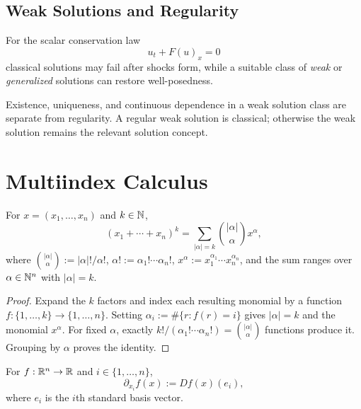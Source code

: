 \subsection{Weak Solutions and Regularity}
\label{sec:weak-solutions-regularity}

For the scalar conservation law
$$u_t + F(u)_x = 0$$
classical solutions may fail after shocks form, while a suitable class of
\emph{weak} or \emph{generalized} solutions can restore well-posedness.

Existence, uniqueness, and continuous dependence in a weak solution class are
separate from regularity. A regular weak solution is classical; otherwise the
weak solution remains the relevant solution concept.

\section{Multiindex Calculus}
\label{sec:multiindex-calculus}

\begin{proposition}
\label{ex:multinomial-theorem}




For $x = (x_1, \ldots, x_n)$ and $k \in \mathbb{N}$,
\[
\left(x_1 + \cdots + x_n\right)^k
= \sum_{|\alpha|=k} \binom{|\alpha|}{\alpha}x^\alpha,
\]
where $\binom{|\alpha|}{\alpha} := |\alpha|!/\alpha!$,
$\alpha! := \alpha_1!\cdots\alpha_n!$, $x^\alpha :=
x_1^{\alpha_1}\cdots x_n^{\alpha_n}$, and the sum ranges over
$\alpha \in \mathbb{N}^n$ with $|\alpha|=k$.
\end{proposition}
\begin{proof}

\sketch
Expand the $k$ factors and index each resulting monomial by a function
$f : \{1,\ldots,k\} \to \{1,\ldots,n\}$. Setting
$\alpha_i := \#\{r : f(r)=i\}$ gives $|\alpha|=k$ and the monomial
$x^\alpha$. For fixed $\alpha$, exactly
$k!/ (\alpha_1!\cdots\alpha_n!) = \binom{|\alpha|}{\alpha}$ functions
produce it. Grouping by $\alpha$ proves the identity.
\end{proof}

\begin{definition}
\label{def:partial-derivative}




For $f : \mathbb{R}^n \to \mathbb{R}$ and $i \in \{1,\ldots,n\}$,
\[
\partial_{x_i}f(x) := Df(x)(e_i),
\]
where $e_i$ is the $i$th standard basis vector.
\end{definition}

